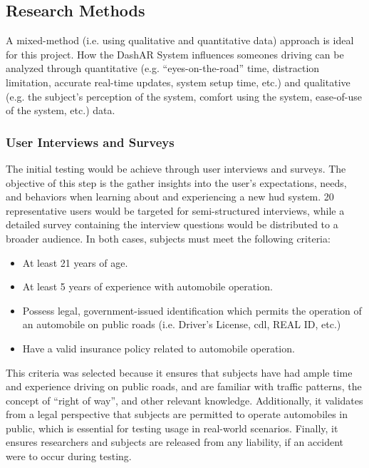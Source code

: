        \subsection{Research Methods}
            \label{sec:researchmethods}
            \par A mixed-method (i.e. using qualitative and quantitative data) approach is ideal for this project. How the DashAR System influences someones driving can be analyzed through quantitative (e.g. ``eyes-on-the-road'' time, distraction limitation, accurate real-time updates, system setup time, etc.) and qualitative (e.g. the subject's perception of the system, comfort using the system, ease-of-use of the system, etc.) data.

            \subsubsection{User Interviews and Surveys}
            \par The initial testing would be achieve through user interviews and surveys. The objective of this step is the gather insights into the user's expectations, needs, and behaviors when learning about and experiencing a new \gls{hud} system. 20 representative users would be targeted for semi-structured interviews, while a detailed survey containing the interview questions would be distributed to a broader audience. In both cases, subjects must meet the following criteria:

            \begin{itemize}
                \item At least 21 years of age.
                \item At least 5 years of experience with automobile operation.
                \item Possess legal, government-issued identification which permits the operation of an automobile on public roads (i.e. Driver's License, \gls{cdl}, REAL ID, etc.)
                \item Have a valid insurance policy related to automobile operation.
            \end{itemize}

            \par This criteria was selected because it ensures that subjects have had ample time and experience driving on public roads, and are familiar with traffic patterns, the concept of ``right of way'', and other relevant knowledge. Additionally, it validates from a legal perspective that subjects are permitted to operate automobiles in public, which is essential for testing usage in real-world scenarios. Finally, it ensures researchers and subjects are released from any liability, if an accident were to occur during testing.

